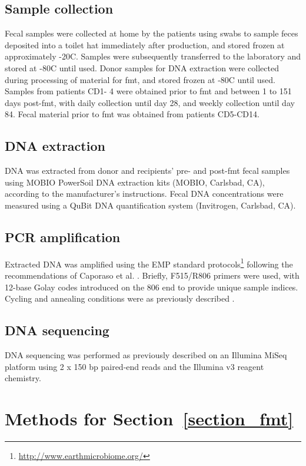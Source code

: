 \subsection{Sample collection}
Fecal samples were collected at home by the patients using swabs to sample 
feces deposited into a toilet hat immediately after production, and stored 
frozen at approximately -20\textdegree C. Samples were subsequently transferred 
to the laboratory and stored at -80\textdegree C until used. Donor samples for 
DNA extraction were collected during processing of material for \gls{fmt}, and 
stored frozen at       -80\textdegree C until used. Samples from patients CD1- 
4 were obtained prior to \gls{fmt} and between 1 to 151 days post-\gls{fmt}, 
with daily collection until day 28, and weekly collection until day 84. Fecal 
material prior to \gls{fmt} was obtained from patients CD5-CD14.

\subsection{DNA extraction}
DNA was extracted from donor and recipients' pre- and post-\gls{fmt} fecal 
samples using MOBIO PowerSoil DNA extraction kits (MOBIO, Carlsbad, CA), 
according to the manufacturer's instructions. Fecal DNA concentrations were 
measured using a QuBit DNA quantification system (Invitrogen, Carlsbad, CA).

\subsection{PCR amplification}
Extracted DNA was amplified using the EMP standard 
protocols\footnote{\url{http://www.earthmicrobiome.org/}} following the 
recommendations of Caporaso et al. \cite{RN4221}. Briefly, F515/R806 primers 
were used, with 12-base Golay codes introduced on the 806 end to provide unique 
sample indices. Cycling and annealing conditions were as previously described 
\cite{RN4221}.

\subsection{DNA sequencing}
DNA sequencing was performed as previously described \cite{RN4221} on an 
Illumina MiSeq platform using 2 x 150 bp paired-end reads and the Illumina v3 
reagent chemistry. 

\section{Methods for Section~\ref{section_fmt}}\label{appendix_fmt}

